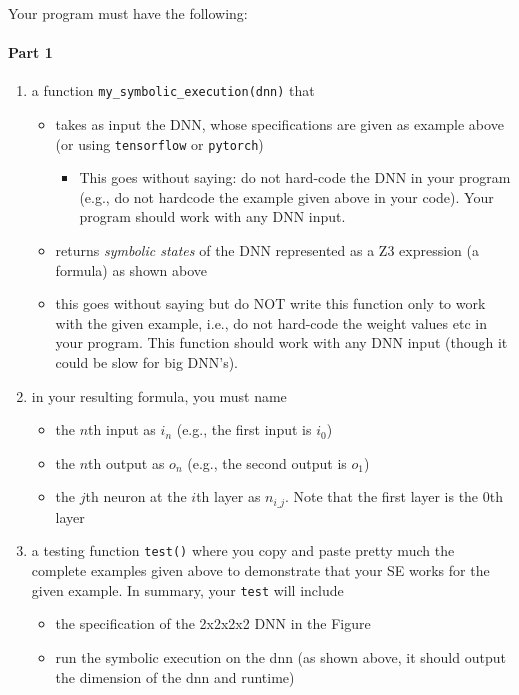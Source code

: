 \documentclass[oneside,11pt,dvipsnames]{book}
\numberwithin{equation}{section}
\theoremstyle{definition}
\theoremstyle{remark}
\begin{document}
Your program must have the following:

\paragraph{Part 1}

\begin{enumerate}
\item a function \texttt{my\_symbolic\_execution(dnn)} that 
    \begin{itemize}
    \item takes as input the DNN, whose specifications are given as example above (or using \texttt{tensorflow} or \texttt{pytorch})
        \begin{itemize}
        \item This goes without saying: do not hard-code the DNN in your program (e.g., do not hardcode the example given above in your code).  Your program should work with any DNN input.
        \end{itemize}
    \item returns \textit{symbolic states} of the DNN represented as a Z3 expression (a formula) as shown above
    \item this goes without saying but do NOT write this function only to work with the given example, i.e., do not hard-code the weight values etc in your program. This function should work with any DNN input (though it could be slow for big DNN's).
    \end{itemize}
\item in your resulting formula, you must name 
    \begin{itemize}
    \item the $n$th input  as $i_n$ (e.g., the first input is $i_0$)
    \item the $n$th output as $o_n$ (e.g., the second output is $o_1$)
    \item the $j$th neuron at the $i$th layer as $n_{i\_j}$.  Note that the first layer is the $0$th layer
    \end{itemize}
\item a testing function \texttt{test()} where you copy and paste pretty much the complete examples given above to demonstrate that your SE works for the given example. In summary, your \texttt{test} will include
    \begin{itemize}
    \item the specification of the 2x2x2x2 DNN in the Figure
    \item run the symbolic execution on the dnn  (as shown above, it should output the dimension of the dnn and runtime)

\end{itemize}
\end{enumerate}
\end{document}
